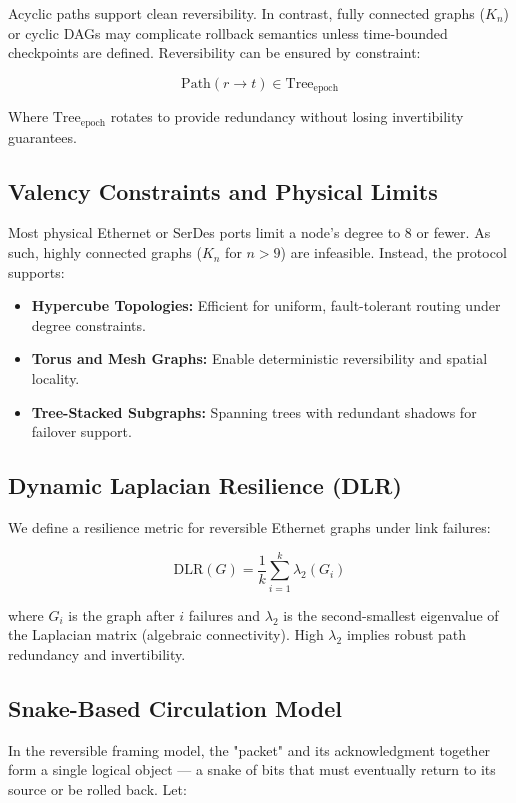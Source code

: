 \documentclass[../../../OAE-SPEC-MAIN.tex]{subfiles}
\begin{document}
Acyclic paths support clean reversibility. In contrast, fully connected graphs ($K_n$) or cyclic DAGs may complicate rollback semantics unless time-bounded checkpoints are defined. Reversibility can be ensured by constraint:

\[
\text{Path}(r \rightarrow t) \in \text{Tree}_{\text{epoch}}
\]

Where $\text{Tree}_{\text{epoch}}$ rotates to provide redundancy without losing invertibility guarantees.

\subsection*{Valency Constraints and Physical Limits}

Most physical Ethernet or SerDes ports limit a node’s degree to 8 or fewer. As such, highly connected graphs ($K_n$ for $n > 9$) are infeasible. Instead, the protocol supports:

\begin{itemize}
  \item \textbf{Hypercube Topologies:} Efficient for uniform, fault-tolerant routing under degree constraints.
  \item \textbf{Torus and Mesh Graphs:} Enable deterministic reversibility and spatial locality.
  \item \textbf{Tree-Stacked Subgraphs:} Spanning trees with redundant shadows for failover support.
\end{itemize}

\subsection*{Dynamic Laplacian Resilience (DLR)}

We define a resilience metric for reversible Ethernet graphs under link failures:

\[
\text{DLR}(G) = \frac{1}{k} \sum_{i=1}^k \lambda_2(G_i)
\]

where $G_i$ is the graph after $i$ failures and $\lambda_2$ is the second-smallest eigenvalue of the Laplacian matrix (algebraic connectivity). High $\lambda_2$ implies robust path redundancy and invertibility.

\subsection*{Snake-Based Circulation Model}

In the reversible framing model, the "packet" and its acknowledgment together form a single logical object — a snake of bits that must eventually return to its source or be rolled back. Let:
\end{document}

